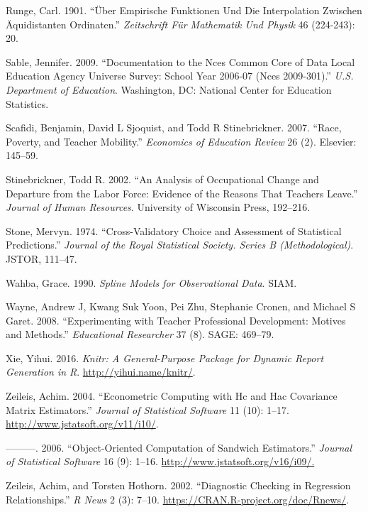 \documentclass[12pt,]{article}
\begin{document}
\hypertarget{ref-runge}{}
Runge, Carl. 1901. ``Über Empirische Funktionen Und Die Interpolation
Zwischen Äquidistanten Ordinaten.'' \emph{Zeitschrift Für Mathematik Und
Physik} 46 (224-243): 20.

\hypertarget{ref-sable}{}
Sable, Jennifer. 2009. ``Documentation to the Nces Common Core of Data
Local Education Agency Universe Survey: School Year 2006-07 (Nces
2009-301).'' \emph{U.S. Department of Education}. Washington, DC:
National Center for Education Statistics.

\hypertarget{ref-scafidi}{}
Scafidi, Benjamin, David L Sjoquist, and Todd R Stinebrickner. 2007.
``Race, Poverty, and Teacher Mobility.'' \emph{Economics of Education
Review} 26 (2). Elsevier: 145--59.

\hypertarget{ref-stinebrickner}{}
Stinebrickner, Todd R. 2002. ``An Analysis of Occupational Change and
Departure from the Labor Force: Evidence of the Reasons That Teachers
Leave.'' \emph{Journal of Human Resources}. University of Wisconsin
Press, 192--216.

\hypertarget{ref-stone}{}
Stone, Mervyn. 1974. ``Cross-Validatory Choice and Assessment of
Statistical Predictions.'' \emph{Journal of the Royal Statistical
Society. Series B (Methodological)}. JSTOR, 111--47.

\hypertarget{ref-wahba}{}
Wahba, Grace. 1990. \emph{Spline Models for Observational Data}. SIAM.

\hypertarget{ref-wayne}{}
Wayne, Andrew J, Kwang Suk Yoon, Pei Zhu, Stephanie Cronen, and Michael
S Garet. 2008. ``Experimenting with Teacher Professional Development:
Motives and Methods.'' \emph{Educational Researcher} 37 (8). SAGE:
469--79.

\hypertarget{ref-xie}{}
Xie, Yihui. 2016. \emph{Knitr: A General-Purpose Package for Dynamic
Report Generation in R}. \url{http://yihui.name/knitr/}.

\hypertarget{ref-zeileis2004}{}
Zeileis, Achim. 2004. ``Econometric Computing with Hc and Hac Covariance
Matrix Estimators.'' \emph{Journal of Statistical Software} 11 (10):
1--17. \url{http://www.jstatsoft.org/v11/i10/}.

\hypertarget{ref-zeileis2006}{}
---------. 2006. ``Object-Oriented Computation of Sandwich Estimators.''
\emph{Journal of Statistical Software} 16 (9): 1--16.
\url{http://www.jstatsoft.org/v16/i09/.}

\hypertarget{ref-zeileis2002}{}
Zeileis, Achim, and Torsten Hothorn. 2002. ``Diagnostic Checking in
Regression Relationships.'' \emph{R News} 2 (3): 7--10.
\url{https://CRAN.R-project.org/doc/Rnews/}.
\end{document}
